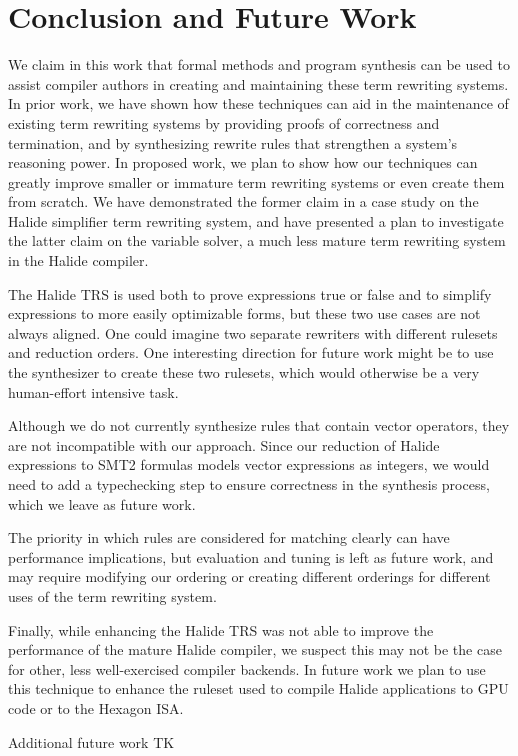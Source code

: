 \chapter{Conclusion and Future Work}
\label{chapter:conclusion}

We claim in this work that formal methods and program synthesis can be used to assist compiler authors in creating and maintaining these term rewriting systems. In prior work, we have shown how these techniques can aid in the maintenance of existing term rewriting systems by providing proofs of correctness and termination, and by synthesizing rewrite rules that strengthen a system's reasoning power. In proposed work, we plan to show how our techniques can greatly improve smaller or immature term rewriting systems or even create them from scratch. We have demonstrated the former claim in a case study on the Halide simplifier term rewriting system, and have presented a plan to investigate the latter claim on the variable solver, a much less mature term rewriting system in the Halide compiler.

The Halide TRS is used both to prove expressions true or false and to
simplify expressions to more easily optimizable forms, but these two use cases
are not always aligned. One could imagine two separate rewriters with
different rulesets and reduction orders. One interesting direction for future
work might be to use the synthesizer to create these two rulesets, which would
otherwise be a very human-effort intensive task.

Although we do not currently synthesize rules that contain vector operators,
they are not incompatible with our approach. Since our reduction of Halide
expressions to SMT2 formulas models vector expressions as integers, we would need
to add a typechecking step to ensure correctness in the synthesis process, which
we leave as future work.

The priority in which rules are considered for matching clearly can have
performance implications, but evaluation and tuning is left as future work, and
may require modifying our ordering or creating different orderings for different
uses of the term rewriting system.

Finally, while enhancing the Halide TRS was not able to improve the performance of the mature Halide compiler, we suspect this may not be the case for other, less well-exercised compiler backends. In future work we plan to use this technique to enhance the ruleset used to compile Halide applications to GPU code or to the Hexagon ISA.

Additional future work TK